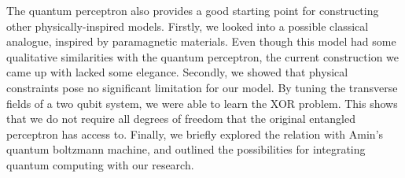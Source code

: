 \noindent The quantum perceptron also provides a good starting point for constructing other physically-inspired models. Firstly, we looked into a possible classical analogue, inspired by paramagnetic materials. Even though this model had some qualitative similarities with the quantum perceptron, the current construction we came up with lacked some elegance. Secondly, we showed that physical constraints pose no significant limitation for our model. By tuning the transverse fields of a two qubit system, we were able to learn the XOR problem. This shows that we do not require all degrees of freedom that the original entangled perceptron has access to. Finally, we briefly explored the relation with Amin's quantum boltzmann machine, and outlined the possibilities for integrating quantum computing with our research.
